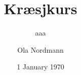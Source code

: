\documentclass[screen, aspectratio=43]{beamer}
\title[Kræsjkurs]{Kræsjkurs}
\subtitle{aaa}
\author[O. Nordmann]{Ola Nordmann}
\institute[NTNU]{, NTNU}
\date{1 January 1970}
\begin{document}
\begin{frame} 
\titlepage
\end{frame} 


\end{document}
